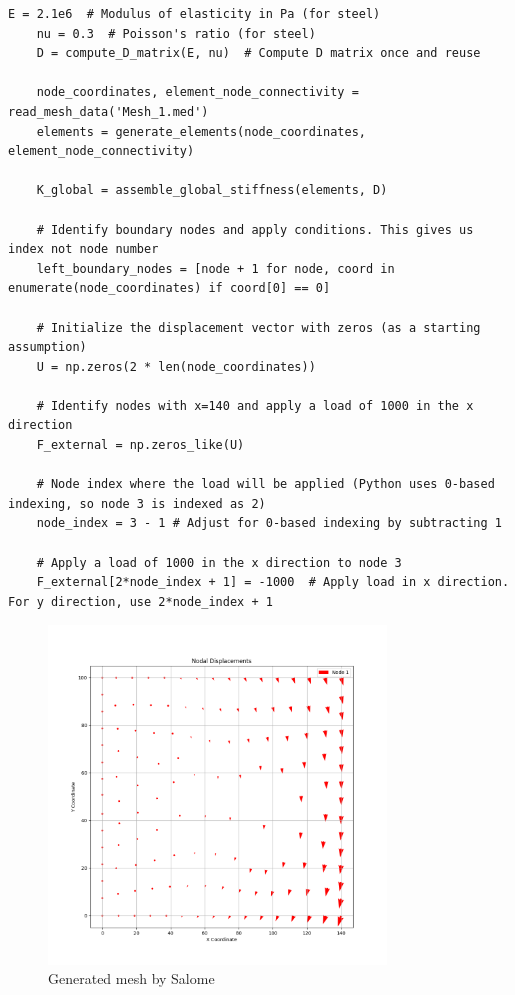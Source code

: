 \documentclass[12pt]{report}
\begin{document}
\begin{lstlisting}[style=mypython, caption={Python code for setting up the FEA problem}]
	E = 2.1e6  # Modulus of elasticity in Pa (for steel)
	nu = 0.3  # Poisson's ratio (for steel)
	D = compute_D_matrix(E, nu)  # Compute D matrix once and reuse
	
	node_coordinates, element_node_connectivity = read_mesh_data('Mesh_1.med')
	elements = generate_elements(node_coordinates, element_node_connectivity)
	
	K_global = assemble_global_stiffness(elements, D)
	
	# Identify boundary nodes and apply conditions. This gives us index not node number
	left_boundary_nodes = [node + 1 for node, coord in enumerate(node_coordinates) if coord[0] == 0]
	
	# Initialize the displacement vector with zeros (as a starting assumption)
	U = np.zeros(2 * len(node_coordinates))
	
	# Identify nodes with x=140 and apply a load of 1000 in the x direction
	F_external = np.zeros_like(U)
	
	# Node index where the load will be applied (Python uses 0-based indexing, so node 3 is indexed as 2)
	node_index = 3 - 1 # Adjust for 0-based indexing by subtracting 1
	
	# Apply a load of 1000 in the x direction to node 3
	F_external[2*node_index + 1] = -1000  # Apply load in x direction. For y direction, use 2*node_index + 1
\end{lstlisting}
	

\begin{figure}[H]
	\centering
	\includegraphics[width=0.8\textwidth]{displacement.png} %
	\caption{Generated mesh by Salome}
	\label{fig:generated mesh}
\end{figure}
\end{document}
